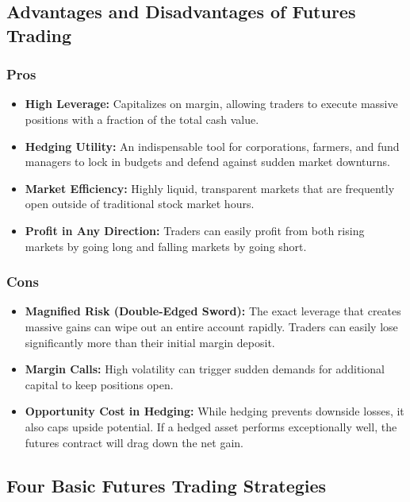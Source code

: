 \documentclass[12pt,openany]{book}
\begin{document}
\subsection{Advantages and Disadvantages of Futures Trading}

\subsubsection{Pros}

\begin{itemize}[leftmargin=*]
    \item \textbf{High Leverage:} Capitalizes on margin, allowing traders to execute massive positions with a fraction of the total cash value.
    \item \textbf{Hedging Utility:} An indispensable tool for corporations, farmers, and fund managers to lock in budgets and defend against sudden market downturns.
    \item \textbf{Market Efficiency:} Highly liquid, transparent markets that are frequently open outside of traditional stock market hours.
    \item \textbf{Profit in Any Direction:} Traders can easily profit from both rising markets by going long and falling markets by going short.
\end{itemize}

\subsubsection{Cons}

\begin{itemize}[leftmargin=*]
    \item \textbf{Magnified Risk (Double-Edged Sword):} The exact leverage that creates massive gains can wipe out an entire account rapidly. Traders can easily lose significantly more than their initial margin deposit.
    \item \textbf{Margin Calls:} High volatility can trigger sudden demands for additional capital to keep positions open.
    \item \textbf{Opportunity Cost in Hedging:} While hedging prevents downside losses, it also caps upside potential. If a hedged asset performs exceptionally well, the futures contract will drag down the net gain.
\end{itemize}

\subsection{Four Basic Futures Trading Strategies}
\end{document}
